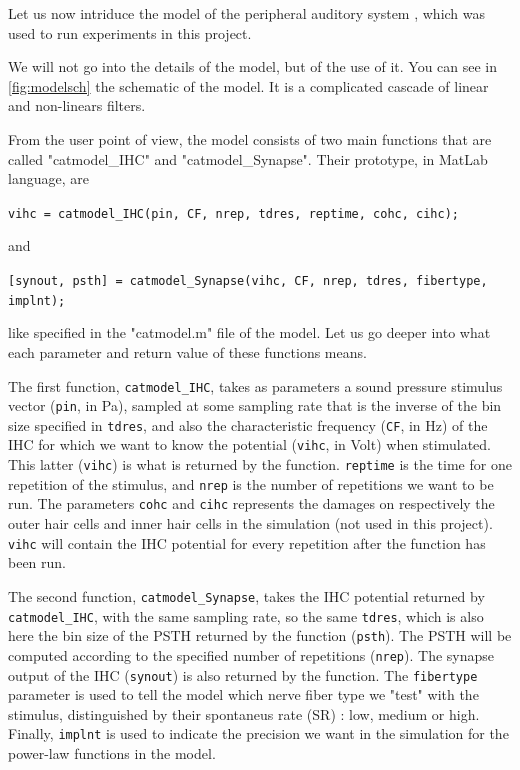 Let us now intriduce the model of the peripheral auditory system
\cite{Model1, Model2, Model3}, which was used to run experiments in this project. 

We will not go into the details of the model, but of the use of it. 
You can see in \autoref{fig:modelsch} the schematic of the model.
It is a complicated cascade of linear and non-linears filters.



From the user point of view, the model consists of two main functions 
that are called "catmodel\_IHC" and "catmodel\_Synapse".
 Their prototype, in MatLab language, are

\texttt{vihc = catmodel\_IHC(pin, CF, nrep, tdres, reptime, cohc, cihc);}

and

\texttt{[synout, psth] = catmodel\_Synapse(vihc, CF, nrep, tdres, fibertype, implnt);}

like specified in the "catmodel.m" file of the model. 
Let us go deeper into what each parameter and return value of these functions means.

The first function, \texttt{catmodel\_IHC}, takes as parameters 
a sound pressure stimulus vector (\texttt{pin}, in Pa), sampled at some sampling rate 
that is the inverse of the bin size specified in \texttt{tdres}, and also
the characteristic frequency (\texttt{CF}, in Hz) 
of the IHC for which we want to know the potential 
(\texttt{vihc}, in Volt) when stimulated. 
This latter (\texttt{vihc}) is what is returned by the function. 
\texttt{reptime} is the time for one repetition of the stimulus, 
and \texttt{nrep} is the number of repetitions we want to be run. 
The parameters \texttt{cohc} and \texttt{cihc} represents the damages on respectively 
the outer hair cells and inner hair cells in the simulation (not used in this project).
\texttt{vihc} will contain the IHC potential for every repetition 
after the function has been run.

The second function, \texttt{catmodel\_Synapse}, 
takes the IHC potential returned by \texttt{catmodel\_IHC}, 
with the same sampling rate, so the same \texttt{tdres}, which is also here the bin size
of the PSTH returned by the function (\texttt{psth}). 
The PSTH will be computed according to the specified number of repetitions (\texttt{nrep}).
The synapse output of the IHC (\texttt{synout}) is also returned by the function.
The \texttt{fibertype} parameter is used to tell the model which nerve fiber type
we "test" with the stimulus, distinguished by their spontaneus rate (SR) : 
low, medium or high. 
Finally, \texttt{implnt} is used to indicate the precision we want in the simulation 
for the power-law functions in the model.

